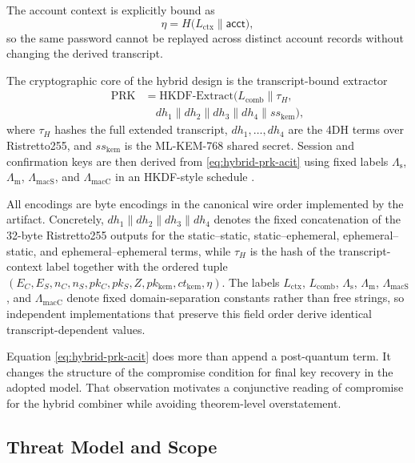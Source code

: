 \documentclass[conference]{IEEEtran}
\newcommand{\acct}{\mathsf{acct}}
\newcommand{\Label}[1]{L_{\mathrm{#1}}}
\newcommand{\KLabel}[1]{\Lambda_{\mathrm{#1}}}
\begin{document}
The account context is explicitly bound as
\begin{equation}
\eta = H\!\bigl(\Label{ctx} \| \acct\bigr),
\end{equation}
so the same password cannot be replayed across distinct account records without changing the derived transcript.

The cryptographic core of the hybrid design is the transcript-bound extractor
\begin{equation}
\begin{aligned}
\mathrm{PRK} &=
\mathrm{HKDF\text{-}Extract}\!\bigl(
\Label{comb} \| \tau_H, \\
&\quad dh_1 \| dh_2 \| dh_3 \| dh_4 \| ss_{\mathrm{kem}}
\bigr),
\end{aligned}
\label{eq:hybrid-prk-acit}
\end{equation}
where $\tau_H$ hashes the full extended transcript, $dh_1,\dots,dh_4$ are the 4DH terms over Ristretto255, and $ss_{\mathrm{kem}}$ is the ML-KEM-768 shared secret. Session and confirmation keys are then derived from \eqref{eq:hybrid-prk-acit} using fixed labels $\KLabel{s}$, $\KLabel{m}$, $\KLabel{macS}$, and $\KLabel{macC}$ in an HKDF-style schedule \cite{krawczyk2010}.

All encodings are byte encodings in the canonical wire order implemented by the artifact. Concretely, $dh_1 \| dh_2 \| dh_3 \| dh_4$ denotes the fixed concatenation of the 32-byte Ristretto255 outputs for the static--static, static--ephemeral, ephemeral--static, and ephemeral--ephemeral terms, while $\tau_H$ is the hash of the transcript-context label together with the ordered tuple $(E_C,E_S,n_C,n_S,pk_C,pk_S,Z,pk_{\mathrm{kem}},ct_{\mathrm{kem}},\eta)$. The labels $\Label{ctx}$, $\Label{comb}$, $\KLabel{s}$, $\KLabel{m}$, $\KLabel{macS}$, and $\KLabel{macC}$ denote fixed domain-separation constants rather than free strings, so independent implementations that preserve this field order derive identical transcript-dependent values.

Equation \eqref{eq:hybrid-prk-acit} does more than append a post-quantum term. It changes the structure of the compromise condition for final key recovery in the adopted model. That observation motivates a conjunctive reading of compromise for the hybrid combiner while avoiding theorem-level overstatement.

\subsection{Threat Model and Scope}
\end{document}
